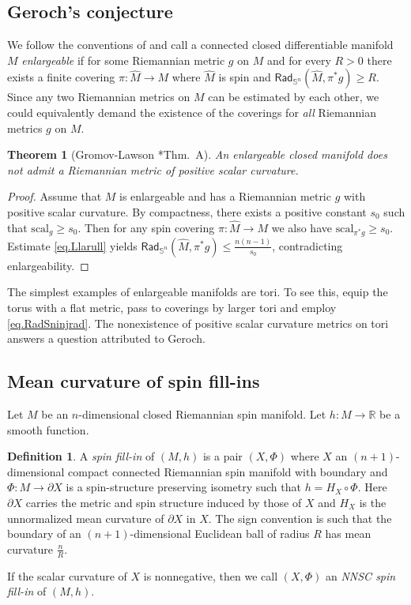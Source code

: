 \documentclass[11pt,reqno]{amsart}
\newcommand{\RadSn}{\mathsf{Rad}_{\Sn}}
\newcommand{\Sn}{\mathbb{S}^n}
\newcommand{\R}{\mathbb{R}}
\newcommand{\dX}{{\partial X}}
\newcommand{\scal}{\mathrm{scal}}
\newcommand{\<}{\langle}
\renewcommand{\>}{\rangle}
\newtheorem{theorem}{Theorem}
\theoremstyle{definition}
\newtheorem{definition}{Definition}
\begin{document}
\subsection{Geroch's conjecture}
We follow the conventions of \cite{GL} and call a connected closed differentiable manifold $M$ \emph{enlargeable} if for some Riemannian metric $g$ on $M$ and for every $R>0$ there exists a finite covering $\pi\colon \hat{M}\to M$ where $\hat{M}$ is spin and $\RadSn(\hat{M},\pi^*g)\ge R$.
Since any two Riemannian metrics on $M$ can be estimated by each other, we could equivalently demand the existence of the coverings for \emph{all} Riemannian metrics $g$ on $M$.

\begin{theorem}[Gromov-Lawson \cite{GL}*{Thm.~A}]
An enlargeable closed manifold does not admit a Riemannian metric of positive scalar curvature.
\end{theorem}

\begin{proof}
Assume that $M$ is enlargeable and has a Riemannian metric $g$ with positive scalar curvature.
By compactness, there exists a positive constant $s_0$ such that $\scal_{g}\ge s_0$.
Then for any spin covering $\pi\colon \hat{M}\to M$ we also have $\scal_{\pi^*g}\ge s_0$.
Estimate \eqref{eq.Llarull} yields $\RadSn(\hat{M},\pi^*g)\le \frac{n(n-1)}{s_0}$, contradicting enlargeability.
\end{proof}

The simplest examples of enlargeable manifolds are tori.
To see this, equip the torus with a flat metric, pass to coverings by larger tori and employ \eqref{eq.RadSninjrad}.
The nonexistence of positive scalar curvature metrics on tori answers a question attributed to Geroch.

\subsection{Mean curvature of spin fill-ins}\label{subsec.fillin}
Let $M$ be an $n$-dimensional closed Riemannian spin manifold.
Let $h\colon M\to\R$ be a smooth function.

\begin{definition}
A \emph{spin fill-in} of $(M,h)$ is a pair $(X,\Phi)$ where $X$ an $(n+1)$-dimensional compact connected Riemannian spin manifold with boundary and $\Phi\colon M\to\dX$ is a spin-structure preserving isometry such that $h=H_X\circ\Phi$.
Here $\dX$ carries the metric and spin structure induced by those of $X$ and $H_X$ is the unnormalized mean curvature of $\dX$ in $X$.
The sign convention is such that the boundary of an $(n+1)$-dimensional Euclidean ball of radius $R$ has mean curvature $\frac{n}{R}$. 

If the scalar curvature of $X$ is nonnegative, then we call $(X,\Phi)$ an \emph{NNSC spin fill-in} of $(M,h)$.
\end{definition}
\end{document}

